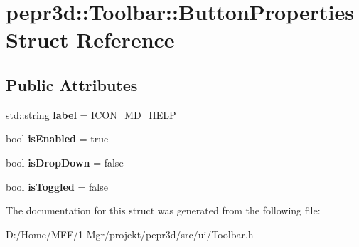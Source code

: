 \hypertarget{structpepr3d_1_1_toolbar_1_1_button_properties}{}\section{pepr3d\+::Toolbar\+::Button\+Properties Struct Reference}
\label{structpepr3d_1_1_toolbar_1_1_button_properties}
\subsection*{Public Attributes}
\begin{DoxyCompactItemize}
\item 
\mbox{\label{structpepr3d_1_1_toolbar_1_1_button_properties_a27e929e1eb3d85e60cd2c0b7e1494d3c}} 
std\+::string {\bfseries label} = I\+C\+O\+N\+\_\+\+M\+D\+\_\+\+H\+E\+LP
\item 
\mbox{\label{structpepr3d_1_1_toolbar_1_1_button_properties_ac47d28b38ac06685a901c8e623060860}} 
bool {\bfseries is\+Enabled} = true
\item 
\mbox{\label{structpepr3d_1_1_toolbar_1_1_button_properties_a8d1b3d99be590b926085c2c43e91e126}} 
bool {\bfseries is\+Drop\+Down} = false
\item 
\mbox{\label{structpepr3d_1_1_toolbar_1_1_button_properties_a2ff9f7a9e7eeba6db62acf91f8355d93}} 
bool {\bfseries is\+Toggled} = false
\end{DoxyCompactItemize}


The documentation for this struct was generated from the following file\+:\begin{DoxyCompactItemize}
\item 
D\+:/\+Home/\+M\+F\+F/1-\/\+Mgr/projekt/pepr3d/src/ui/Toolbar.\+h\end{DoxyCompactItemize}
